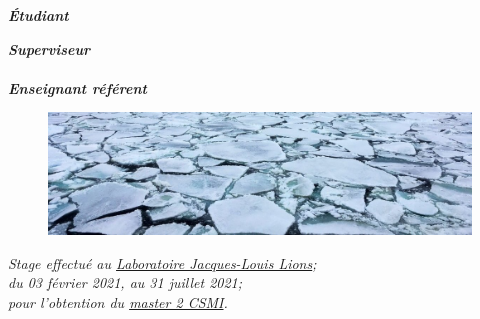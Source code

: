 \documentclass[ 
11pt, %
french, %
singlespacing, %
parskip, %
headsepline, %
openany, %
]{MastersDoctoralThesis} %
\renewcommand{\emph}[1]{\textbf{\textit{#1}}} %
\numberwithin{theorem}{section}  %
\begin{document}
\begin{titlepage}
\begin{center}
\begin{minipage}[t]{0.4\textwidth}
\begin{flushleft} \large
\vspace{7mm}
\emph{Étudiant}\\
\href{https://github.com/desmond-rn}{\authorname} %
\end{flushleft}
\end{minipage}
\begin{minipage}[t]{0.4\textwidth}
\begin{flushright} \large
\emph{Superviseur} \\
\href{https://www-ljk.imag.fr/membres/Stephane.Labbe/}{\supname} %
\\ \vspace{5mm}
\emph{Enseignant référent} \\
\href{http://www.feelpp.org/team/prudhomm/}{\examname} %
\end{flushright}
\end{minipage}%


\begin{figure}[H]
    \centering
    \includegraphics[width=.9\linewidth]{IntroPic.jpg}
    \label{Fig:IntroPic}
\end{figure}



\large \textit{Stage effectué au \href{https://www.ljll.math.upmc.fr/?lang=fr}{Laboratoire Jacques-Louis Lions};}\\[0.2cm]
\textit{du 03 février 2021, au 31 juillet 2021;}\\[0.2cm]
\textit{pour l'obtention du \href{https://docs.google.com/document/d/10JbbXeqqu5J2BjMkSQRNQ8Gx7xBPOClLKpvd7EBZT8U/edit}{master 2 CSMI}. }\\[0.2cm]


\end{center}
\end{titlepage}
\end{document}
